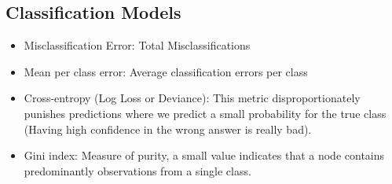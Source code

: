 \documentclass[12pt, oneside]{article}
\begin{document}
\subsection{Classification Models}
\begin{itemize}
    \item Misclassification Error: Total Misclassifications
    \item Mean per class error: Average classification errors per class
    \item Cross-entropy (Log Loss or Deviance): This metric disproportionately punishes predictions where we predict a small probability for the true class (Having high confidence in the wrong answer is really bad).
    \item Gini index: Measure of purity, a small value indicates that a node contains predominantly observations from a single class.
\end{itemize}
\end{document}
